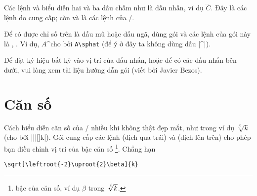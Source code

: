 \documentclass[11pt,leqno,titlepage,openany]{amsldoc}[1999/12/13]
\begin{document}
\medskip
Các lệnh  và  biểu diễn hai và ba dấu chấm
như là dấu nhấn, ví dụ $\dddot C$. Đây là các lệnh do  cung cấp;
còn  và  là các lệnh của \latex/.

\medskip
Để có được chỉ số trên là dấu mũ hoặc dấu ngã, dùng gói 
và các lệnh của gói này là , . Ví dụ,
$A\sphat$\space\space cho bởi \verb'A\sphat' (để ý ở đây ta không dùng dấu |^|).

\medskip
Để đặt ký hiệu bất kỳ vào vị trí của dấu nhấn, hoặc để có các dấu nhấn
bên dưới, vui lòng xem tài liệu hướng dẫn gói (viết bởi Javier Bezos).

\section{Căn số}

Cách biểu diễn căn số của \latex/ nhiều khi không thật đẹp mắt, như
trong ví dụ $\sqrt[\beta]{k}$ (cho bởi |\sqrt||[\beta]{k}|). 
Gói  cung cấp các lệnh  (dịch qua trái) và 
(dịch lên trên)
cho phép bạn điều chỉnh vị trí của bậc căn số%
\footnote{bậc của căn số, ví dụ $\beta$ trong $\sqrt[\leftroot{-2}\uproot{2}\beta]{k}$.}.
Chẳng hạn

\medskip
\begin{verbatim}
\sqrt[\leftroot{-2}\uproot{2}\beta]{k}
\end{verbatim}
\end{document}
